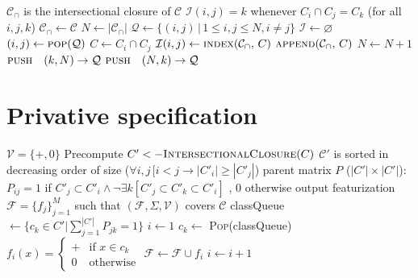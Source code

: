 \documentclass[11pt, oneside]{article}   	%
\begin{document}
\vspace{\baselineskip} \noindent \begin{algorithmic}
    \ENSURE $\mathcal C_\cap$ is the intersectional closure of $\mathcal C$
    \ENSURE $\mathcal I(i,j) = k$ whenever $C_i \cap C_j = C_k$ (for all $i, j, k$)
    \STATE
    \STATE $\mathcal C_\cap \leftarrow \mathcal C$ \quad \quad \quad \quad \quad \quad \quad \quad \quad \quad \quad \quad {}
    \STATE $N \leftarrow | \mathcal C_\cap |$ \quad \quad \quad \quad \quad \quad \quad \quad \quad \quad \quad {}
    \STATE $\mathcal Q \leftarrow \{ (i, j) \, | \, 1 \leq i, j \leq N, i \neq j \}$ \quad {}
    \STATE $\mathcal I \leftarrow \varnothing$ \quad \quad \quad \quad \quad \quad \quad \quad \quad \quad \quad \quad {}
    \STATE
        \STATE $(i, j) \leftarrow \textsc{pop}(\mathcal Q)$
            \STATE $C \leftarrow C_i \cap C_j$
                \STATE $\mathcal I(i, j) \leftarrow \textsc{index}(\mathcal C_\cap, \, C)$
            \ELSE
                \STATE $\textsc{append}(\mathcal C_\cap, \, C)$
                \STATE $N \leftarrow N+1$
                    \STATE $\textsc{push} \quad (k, N) \rightarrow \mathcal Q$
                    \STATE $\textsc{push} \quad(N, k) \rightarrow \mathcal Q$
                \ENDFOR
            \ENDIF
        \ENDIF
    \ENDWHILE
\end{algorithmic}

\section{Privative specification}

\vspace{\baselineskip} \noindent \begin{algorithmic}
	\REQUIRE $\mathcal V = \{ +, 0 \}$
	\REQUIRE Precompute $C' <- \textsc{IntersectionalClosure}(C)$
	\REQUIRE $\mathcal C'$ is sorted in decreasing order of size ($\forall i, j \, [i < j \rightarrow |C'_i| \geq |C'_j|$)
	\REQUIRE parent matrix $P$ ($|C'| \times |C'|$): $P_{ij} = 1$ if $C'_j \subset C'_i \land \neg \exists k [C'_j \subset C'_k \subset C'_i]$ , $0$ otherwise
	\ENSURE output featurization $\mathcal F = \{ f_j \}_{j=1}^M$ such that $(\mathcal F, \Sigma, \mathcal V)$ covers $\mathcal C$
	\STATE
	\STATE classQueue $\leftarrow \{c_k \in C' | \sum_{j=1}^{|C'|}P_{jk} = 1 \}$
	\STATE $i \leftarrow 1$
	\STATE
	\STATE $c_k \leftarrow$ \textsc{Pop}(classQueue)
	\STATE $f_i(x) = \begin{cases}
		+ & \mbox{if } x \in c_k \\
		0 & \mbox{otherwise}
		\end{cases} $
	\STATE $\mathcal F \leftarrow \mathcal F \cup f_i$
	\STATE $i \leftarrow i + 1$
	\ENDWHILE
\end{algorithmic}
\end{document}
